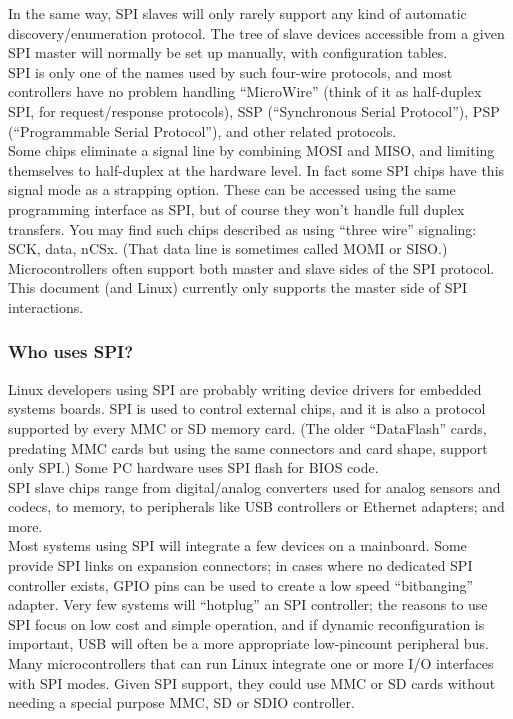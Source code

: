 In the same way, SPI slaves will only rarely support any kind of automatic discovery/enumeration protocol.  The tree of slave devices accessible from a given SPI master will normally be set up manually, with configuration tables.\\
SPI is only one of the names used by such four-wire protocols, and most controllers have no problem handling ``MicroWire'' (think of it as half-duplex SPI, for request/response protocols), SSP (``Synchronous Serial Protocol''), PSP (``Programmable Serial Protocol''), and other related protocols.\\
Some chips eliminate a signal line by combining MOSI and MISO, and limiting themselves to half-duplex at the hardware level. In fact some SPI chips have this signal mode as a strapping option.  These can be accessed using the same programming interface as SPI, but of course they won't handle full duplex transfers.  You may find such chips described as using ``three wire'' signaling: SCK, data, nCSx. (That data line is sometimes called MOMI or SISO.) \\
Microcontrollers often support both master and slave sides of the SPI protocol.  This document (and Linux) currently only supports the master side of SPI interactions.
\subsubsection{Who uses SPI?}
Linux developers using SPI are probably writing device drivers for embedded systems boards.  SPI is used to control external chips, and it is also a protocol supported by every MMC or SD memory card.  (The older ``DataFlash'' cards, predating MMC cards but using the same connectors and card shape, support only SPI.)  Some PC hardware uses SPI flash for BIOS code. \\
SPI slave chips range from digital/analog converters used for analog sensors and codecs, to memory, to peripherals like USB controllers or Ethernet adapters; and more. \\
Most systems using SPI will integrate a few devices on a mainboard. Some provide SPI links on expansion connectors; in cases where no dedicated SPI controller exists, GPIO pins can be used to create a low speed ``bitbanging'' adapter.  Very few systems will ``hotplug'' an SPI controller; the reasons to use SPI focus on low cost and simple operation, and if dynamic reconfiguration is important, USB will often be a more appropriate low-pincount peripheral bus. \\
Many microcontrollers that can run Linux integrate one or more I/O interfaces with SPI modes. Given SPI support, they could use MMC or SD cards without needing a special purpose MMC, SD or SDIO controller.
